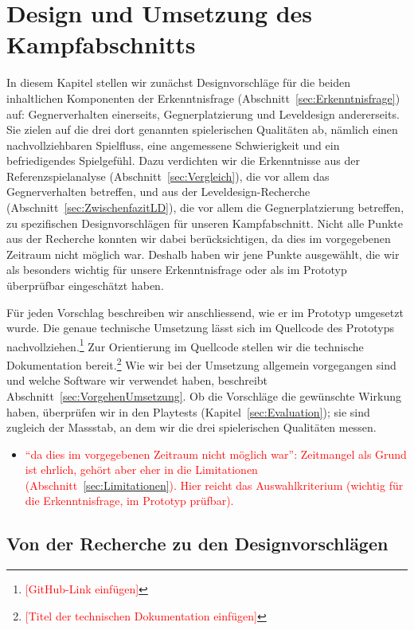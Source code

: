 \documentclass[../Main.tex]{subfiles}
\begin{document}
\section{Design und Umsetzung des Kampfabschnitts} \label{sec:Umsetzung}

In diesem Kapitel stellen wir zunächst Designvorschläge für die beiden inhaltlichen Komponenten der Erkenntnisfrage (Abschnitt~\ref{sec:Erkenntnisfrage}) auf: Gegnerverhalten einerseits, Gegnerplatzierung und Leveldesign andererseits. Sie zielen auf die drei dort genannten spielerischen Qualitäten ab, nämlich einen nachvollziehbaren Spielfluss, eine angemessene Schwierigkeit und ein befriedigendes Spielgefühl. Dazu verdichten wir die Erkenntnisse aus der Referenzspielanalyse (Abschnitt~\ref{sec:Vergleich}), die vor allem das Gegnerverhalten betreffen, und aus der Leveldesign-Recherche (Abschnitt~\ref{sec:ZwischenfazitLD}), die vor allem die Gegnerplatzierung betreffen, zu spezifischen Designvorschlägen für unseren Kampfabschnitt. Nicht alle Punkte aus der Recherche konnten wir dabei berücksichtigen, da dies im vorgegebenen Zeitraum nicht möglich war. Deshalb haben wir jene Punkte ausgewählt, die wir als besonders wichtig für unsere Erkenntnisfrage oder als im Prototyp überprüfbar eingeschätzt haben.

Für jeden Vorschlag beschreiben wir anschliessend, wie er im Prototyp umgesetzt wurde. Die genaue technische Umsetzung lässt sich im Quellcode des Prototyps nachvollziehen.\footnote{\textcolor{red}{[GitHub-Link einfügen]}} Zur Orientierung im Quellcode stellen wir die technische Dokumentation bereit.\footnote{\textcolor{red}{[Titel der technischen Dokumentation einfügen]}} Wie wir bei der Umsetzung allgemein vorgegangen sind und welche Software wir verwendet haben, beschreibt Abschnitt~\ref{sec:VorgehenUmsetzung}. Ob die Vorschläge die gewünschte Wirkung haben, überprüfen wir in den Playtests (Kapitel~\ref{sec:Evaluation}); sie sind zugleich der Massstab, an dem wir die drei spielerischen Qualitäten messen.

\begin{itemize}[leftmargin=1.5cm]
    \item \textcolor{red}{\enquote{da dies im vorgegebenen Zeitraum nicht möglich war}: Zeitmangel als Grund ist ehrlich, gehört aber eher in die Limitationen (Abschnitt~\ref{sec:Limitationen}). Hier reicht das Auswahlkriterium (wichtig für die Erkenntnisfrage, im Prototyp prüfbar).}
\end{itemize}

\subsection{Von der Recherche zu den Designvorschlägen} \label{sec:Designvorschlaege}
\end{document}
